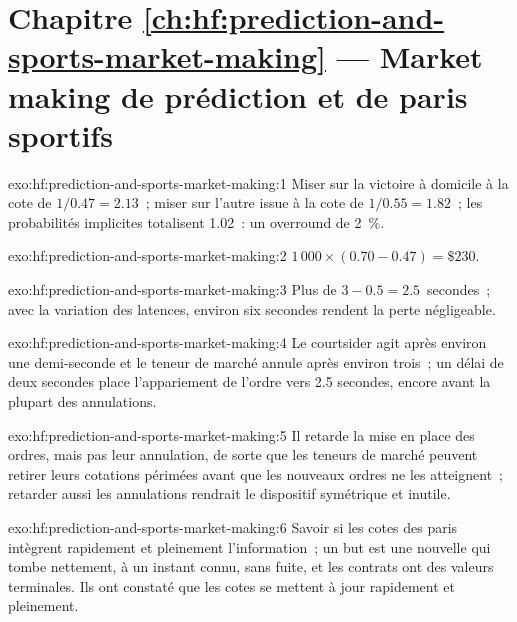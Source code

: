 \section*{Chapitre \ref{ch:hf:prediction-and-sports-market-making} --- Market making de prédiction et de paris sportifs}

\begin{solution}{exo:hf:prediction-and-sports-market-making:1}
Miser sur la victoire à domicile à la cote de $1/0.47=2.13$~; miser sur l'autre issue à la cote de $1/0.55=1.82$~; les probabilités implicites totalisent 1.02~: un overround de 2~\%.
\end{solution}

\begin{solution}{exo:hf:prediction-and-sports-market-making:2}
$1\,000\times(0.70-0.47)=\$230$.
\end{solution}

\begin{solution}{exo:hf:prediction-and-sports-market-making:3}
Plus de $3-0.5=2.5$~secondes~; avec la variation des latences, environ six secondes rendent la perte négligeable.
\end{solution}

\begin{solution}{exo:hf:prediction-and-sports-market-making:4}
Le courtsider agit après environ une demi-seconde et le teneur de marché annule après environ trois~; un délai de deux secondes place l'appariement de l'ordre vers 2.5
secondes, encore avant la plupart des annulations.
\end{solution}

\begin{solution}{exo:hf:prediction-and-sports-market-making:5}
Il retarde la mise en place des ordres, mais pas leur annulation, de sorte que les teneurs de marché peuvent retirer leurs cotations périmées avant que les nouveaux ordres ne les atteignent~; retarder aussi les annulations
rendrait le dispositif symétrique et inutile.
\end{solution}

\begin{solution}{exo:hf:prediction-and-sports-market-making:6}
Savoir si les cotes des paris intègrent rapidement et pleinement l'information~; un but est une nouvelle qui tombe nettement, à un instant connu, sans fuite, et les
contrats ont des valeurs terminales. Ils ont constaté que les cotes se mettent à jour rapidement et pleinement.
\end{solution}

